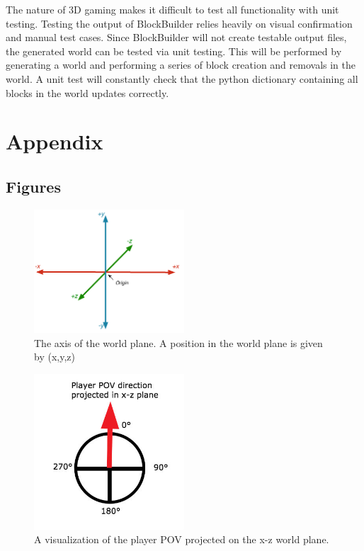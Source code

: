 \documentclass[12pt, titlepage]{article}
\begin{document}
The nature of 3D gaming makes it difficult to test all functionality with unit testing. Testing the output of BlockBuilder relies heavily on visual confirmation and manual test cases. Since BlockBuilder will not create testable output files, the generated world can be tested via unit testing. This will be performed by generating a world and performing a series of block creation and removals in the world. A unit test will constantly check that the python dictionary containing all blocks in the world updates correctly.





\newpage

\section{Appendix}

\subsection{Figures}
\begin{figure}[!h]
\centering
\includegraphics[width=0.5\textwidth]{Worldplane.png}
\caption{The axis of the world plane. A position in the world plane is given by (x,y,z) }
\end{figure}
\FloatBarrier

\begin{figure}[!h]
\centering
\includegraphics[width=0.5\textwidth]{POVZXPlane.jpg}
\caption{A visualization of the player POV projected on the x-z world plane. }
\end{figure}
\FloatBarrier
\end{document}
